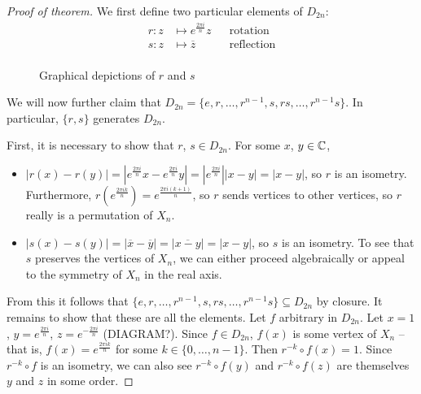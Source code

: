 \documentclass{../../template/note}
\begin{document}
    \begin{proof}[Proof of theorem]
        We first define two particular elements of \(D_{2n}\):
        \begin{align*}
            r: z &\mapsto e^{\frac{2 \pi i}{n}}z && \text{rotation} \\
            s: z &\mapsto \overline{z} && \text{reflection} \\
        \end{align*}

        \begin{figure}[ht]
            \centering
            \caption{Graphical depictions of \(r\) and \(s\)}
            \label{fig:dihedral-group-operations}
        \end{figure}      

        We will now further claim that \(D_{2n} = \{e, r, \dots, r^{n-1}, s, rs, \dots, r^{n-1}s\}\). In particular, \(\{r, s\}\) generates \(D_{2n}\).

        First, it is necessary to show that \(r\), \(s \in D_{2n}\). For some \(x\), \(y \in \mathbb C\),
        \begin{itemize}
            \item \(|r(x) - r(y)| = |e^{\frac{2 \pi i}{n}} x - e^{\frac{2 \pi i}{n}} y| = |e^{\frac{2 \pi i}{n}}||x - y| = |x-y|\), so \(r\) is an isometry. Furthermore, \(r(e^{\frac{2 \pi i k}{n}}) = e^{\frac{2 \pi i (k+1)}{n}}\), so \(r\) sends vertices to other vertices, so \(r\) really is a permutation of \(X_n\).
            \item \(|s(x) - s(y)| = |\overline{x} - \overline{y}| = |\overline{x-y}| = |x-y|\), so \(s\) is an isometry. To see that \(s\) preserves the vertices of \(X_n\), we can either proceed algebraically or appeal to the symmetry of \(X_n\) in the real axis.
        \end{itemize}
        
        From this it follows that \(\{e, r, \dots, r^{n-1}, s, rs, \dots, r^{n-1}s\} \subseteq D_{2n}\) by closure. It remains to show that these are all the elements. Let \(f\) arbitrary in \(D_{2n}\). Let \(x=1\), \(y=e^{\frac{2\pi i}{n}}\), \(z=e^{-\frac{2\pi i}{n}}\) (DIAGRAM?). Since \(f \in D_{2n}\), \(f(x)\) is some vertex of \(X_n\) -- that is, \(f(x) = e^{\frac{2 \pi i k}{n}}\) for some \(k \in \{0, \dots, n-1\}\). Then \(r^{-k} \circ f(x) = 1\). Since \(r^{-k} \circ f\) is an isometry, we can also see \(r^{-k} \circ f(y)\) and \(r^{-k} \circ f(z)\) are themselves \(y\) and \(z\) in some order.


\end{proof}
\end{document}
